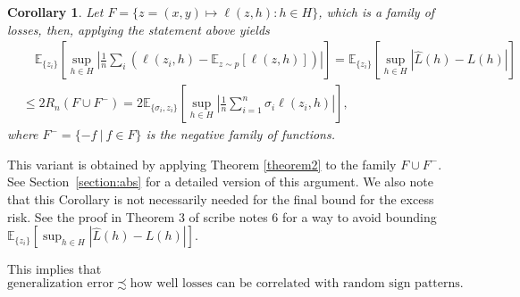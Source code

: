 \documentclass[11pt]{article}
\newcommand{\exu}[2]{\mathbb{E}_{#1}\left[{#2}\right]}
\newtheorem{corollary}{Corollary}
\begin{document}
\begin{corollary}
  \label{corollary:abs}
  Let $F = \{z = (x, y) \mapsto \ell(z, h) : h \in H\}$, which is a family of losses, then, applying the statement above yields
  \begin{align*}
    & \quad \exu{\{z_i\}}{\sup_{h \in H} \left|\frac{1}{n}\sum_i\left( \ell(z_i, h) - \exu{z \sim p}{\ell(z, h)}\right)\right|} = \exu{\{z_i\}}{\sup_{h \in H} |\hat L (h) - L(h)|} \\
    & \le 2R_n(F\cup F^-) = 2\exu{\{\sigma_i,z_i\}}{\sup_{h\in H}\left| \frac{1}{n}\sum_{i=1}^n\sigma_i\ell(z_i,h) \right|},
  \end{align*}
  where $F^- = \{-f~|~f\in F\}$ is the negative family of functions.
\end{corollary}
This variant is obtained by applying Theorem \ref{theorem2} to the family $F\cup F^-$. See Section~\ref{section:abs} for a detailed version of this argument. We also note that this Corollary is not necessarily needed for the final bound for the excess risk. See the proof in Theorem 3 of scribe notes 6 for a way to avoid bounding $\exu{\{z_i\}}{\sup_{h \in H} |\hat L (h) - L(h)|}$.  
\vspace{0.2in}

This implies that
\[
  \text{generalization error} \precsim \text{how well losses can be correlated with random sign patterns}.
\]
\end{document}
